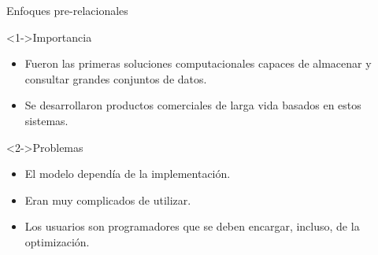 \begin{frame}{Enfoques pre-relacionales}
    \vspace{5mm}
    \begin{overlayarea}{\linewidth}{\textheight}
        
        \begin{block}<1->{Importancia}
            \begin{itemize}
                \item Fueron las primeras soluciones computacionales capaces de almacenar y consultar grandes conjuntos de datos.
                \item Se desarrollaron productos comerciales de larga vida basados en estos sistemas.
            \end{itemize}
            
        \end{block}
    
        \begin{block}<2->{Problemas}
            \begin{itemize}
                \item<3-> El modelo depend\'ia de la implementaci\'on.
                \item<5-> Eran muy complicados de utilizar.
                \item<6-> Los usuarios son programadores que se deben encargar, incluso, de la optimizaci\'on.
    
            \end{itemize}
        \end{block}
    \end{overlayarea}
\end{frame}


